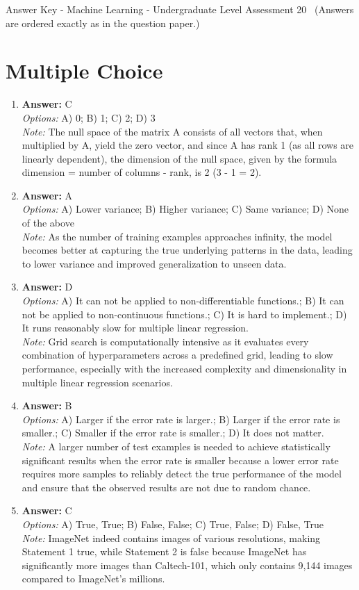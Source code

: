 \documentclass[12pt]{article}
\begin{document}
\begin{center}
Answer Key - Machine Learning - Undergraduate Level Assessment 20 \
\small (Answers are ordered exactly as in the question paper.)
\end{center}

\section*{Multiple Choice}
\begin{enumerate}[label=\arabic*.]
\item \textbf{Answer:} C
\\ \textit{Options:} A) 0; B) 1; C) 2; D) 3
\\ \textit{Note:} The null space of the matrix A consists of all vectors that, when multiplied by A, yield the zero vector, and since A has rank 1 (as all rows are linearly dependent), the dimension of the null space, given by the formula dimension = number of columns - rank, is 2 (3 - 1 = 2).
\item \textbf{Answer:} A
\\ \textit{Options:} A) Lower variance; B) Higher variance; C) Same variance; D) None of the above
\\ \textit{Note:} As the number of training examples approaches infinity, the model becomes better at capturing the true underlying patterns in the data, leading to lower variance and improved generalization to unseen data.
\item \textbf{Answer:} D
\\ \textit{Options:} A) It can not be applied to non-differentiable functions.; B) It can not be applied to non-continuous functions.; C) It is hard to implement.; D) It runs reasonably slow for multiple linear regression.
\\ \textit{Note:} Grid search is computationally intensive as it evaluates every combination of hyperparameters across a predefined grid, leading to slow performance, especially with the increased complexity and dimensionality in multiple linear regression scenarios.
\item \textbf{Answer:} B
\\ \textit{Options:} A) Larger if the error rate is larger.; B) Larger if the error rate is smaller.; C) Smaller if the error rate is smaller.; D) It does not matter.
\\ \textit{Note:} A larger number of test examples is needed to achieve statistically significant results when the error rate is smaller because a lower error rate requires more samples to reliably detect the true performance of the model and ensure that the observed results are not due to random chance.
\item \textbf{Answer:} C
\\ \textit{Options:} A) True, True; B) False, False; C) True, False; D) False, True
\\ \textit{Note:} ImageNet indeed contains images of various resolutions, making Statement 1 true, while Statement 2 is false because ImageNet has significantly more images than Caltech-101, which only contains 9,144 images compared to ImageNet's millions.
\end{enumerate}
\end{document}
